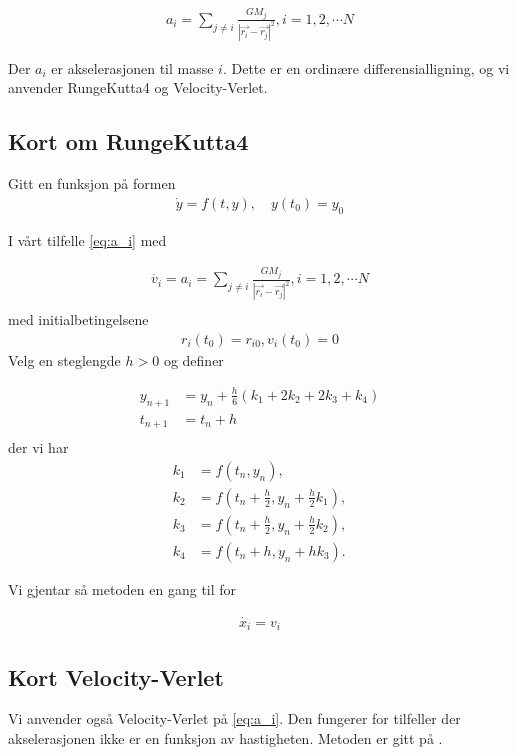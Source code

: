 \documentclass[11pt, twocolumn]{article}
\begin{document}
\begin{align} \label{eq:a_i}
a_i = \sum_{j \neq i} \frac{GM_j}{{|\vec{r_i} - \vec{r_j}|}^2} ,  i = 1,2, \cdots N 
\end{align}

Der $a_i$ er akselerasjonen til masse $i$. Dette er en ordinære differensialligning, og
vi anvender RungeKutta4 og Velocity-Verlet.

\subsection{Kort om RungeKutta4 }
Gitt en funksjon på formen \cite{RK4}
\begin{align*}
\dot{y} = f(t, y), \quad y(t_0) = y_0
\end{align*}

I vårt tilfelle \eqref{eq:a_i} med 

\begin{align*}
\dot{v_i} = a_i  = \sum_{j \neq i} \frac{GM_j}{{|\vec{r_i} - \vec{r_j}|}^2} , i = 1,2, \cdots N \\
\end{align*}
med initialbetingelsene
\begin{align*}
r_i(t_0) = r_{i0}, v_i(t_0) = 0
\end{align*}
Velg en steglengde $h>0$ og definer 

\begin{align*}
y_{n+1} &= y_n + \tfrac{h}{6}\left(k_1 + 2k_2 + 2k_3 + k_4 \right)\\
t_{n+1} &= t_n + h \\
\end{align*}
der vi har
\begin{align*}
k_1 &= f(t_n, y_n), \\
k_2 &= f(t_n + \tfrac{h}{2}, y_n + \tfrac{h}{2} k_1), \\
k_3 &= f(t_n + \tfrac{h}{2}, y_n + \tfrac{h}{2} k_2), \\
k_4 &= f(t_n + h, y_n + hk_3).
\end{align*}

Vi gjentar så metoden en gang til for 

\begin{align*}
\dot{x_i} = v_i
\end{align*}

\subsection{Kort Velocity-Verlet}
Vi anvender også Velocity-Verlet på \eqref{eq:a_i}. Den fungerer for tilfeller der 
akselerasjonen ikke er en funksjon av hastigheten. 
Metoden er gitt på \cite{Velocity-Verlet}.
\end{document}
